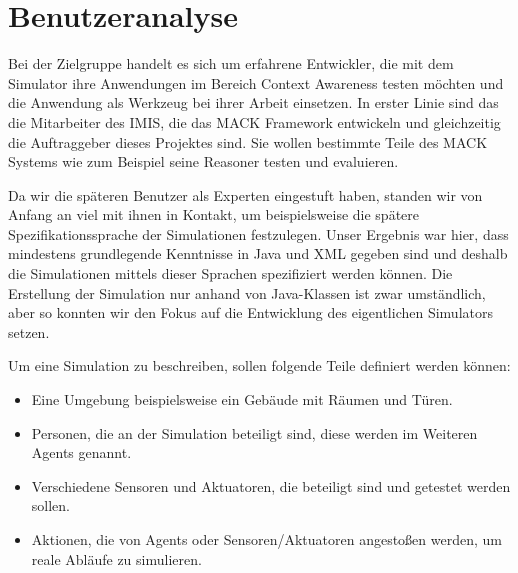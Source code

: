 
\section{Benutzeranalyse}\label{sec:user_ana}

Bei der Zielgruppe handelt es sich um erfahrene Entwickler, die mit dem Simulator ihre Anwendungen im Bereich Context Awareness testen möchten und die Anwendung als Werkzeug bei ihrer Arbeit einsetzen. In erster Linie sind das die Mitarbeiter des IMIS, die das MACK Framework entwickeln und gleichzeitig die Auftraggeber dieses Projektes sind. Sie wollen bestimmte Teile des MACK Systems wie zum Beispiel seine Reasoner testen und evaluieren.

Da wir die späteren Benutzer als Experten eingestuft haben, standen wir von Anfang an viel mit ihnen in Kontakt, um beispielsweise die spätere Spezifikationssprache der Simulationen festzulegen. Unser Ergebnis war hier, dass mindestens grundlegende Kenntnisse in Java und XML gegeben sind und deshalb die Simulationen mittels dieser Sprachen spezifiziert werden können. Die Erstellung der Simulation nur anhand von Java-Klassen ist zwar umständlich, aber so konnten wir den Fokus auf die Entwicklung des eigentlichen Simulators setzen.

Um eine Simulation zu beschreiben, sollen folgende Teile definiert werden können:
\begin{itemize}
\item Eine Umgebung beispielsweise ein Gebäude mit Räumen und Türen.
\item Personen, die an der Simulation beteiligt sind, diese werden im Weiteren Agents genannt.
\item Verschiedene Sensoren und Aktuatoren, die beteiligt sind und getestet werden sollen.
\item Aktionen, die von Agents oder Sensoren/Aktuatoren angestoßen werden, um reale Abläufe zu simulieren.
\end{itemize}
  

